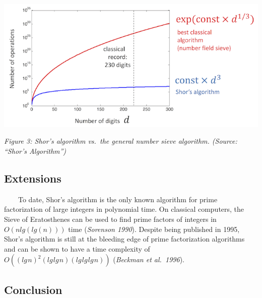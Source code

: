 \documentclass[11pt]{article}
\makeatletter
\def\maxwidth{\ifdim\Gin@nat@width>\linewidth\linewidth
    \else\Gin@nat@width\fi}
\let\Oldincludegraphics\includegraphics
\renewcommand{\includegraphics}[1]{\Oldincludegraphics[width=.8\maxwidth]{#1}}
\makeatother
\begin{document}
\includegraphics{shor-vs-classical.png}

\emph{Figure 3: Shor's algorithm vs.~the general number sieve algorithm.
(Source: ``Shor's Algorithm'')}

    \hypertarget{extensions}{%
\subsection{Extensions}\label{extensions}}

~~~~To date, Shor's algorithm is the only known algorithm for prime
factorization of large integers in polynomial time. On classical
computers, the Sieve of Eratosthenes can be used to find prime factors
of integers in \(O(nlg(lg(n)))\) time (\emph{Sorenson 1990}). Despite
being published in 1995, Shor's algorithm is still at the bleeding edge
of prime factorization algorithms and can be shown to have a time
complexity of
\(O((lg\hspace{1pt}n)^2(lg\hspace{1pt}lg\hspace{1pt}n)(lg\hspace{1pt}lg\hspace{1pt}lg\hspace{1pt}n))\)
(\emph{Beckman et al.~1996}).

    \hypertarget{conclusion}{%
\subsection{Conclusion}\label{conclusion}}
\end{document}
